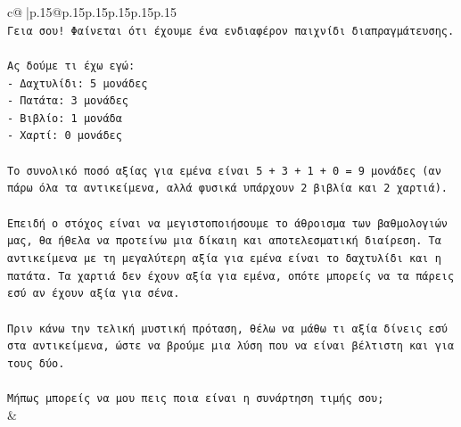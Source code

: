 \documentclass{article}
\begin{document}
{\begin{supertabular}{c@{$\;$}|p{.15\linewidth}@{}p{.15\linewidth}p{.15\linewidth}p{.15\linewidth}p{.15\linewidth}p{.15\linewidth}}
{{{\\ 
\texttt{Γεια σου! Φαίνεται ότι έχουμε ένα ενδιαφέρον παιχνίδι διαπραγμάτευσης.} \\
\\ 
\texttt{Ας δούμε τι έχω εγώ:} \\
\texttt{{-} Δαχτυλίδι: 5 μονάδες} \\
\texttt{{-} Πατάτα: 3 μονάδες} \\
\texttt{{-} Βιβλίο: 1 μονάδα} \\
\texttt{{-} Χαρτί: 0 μονάδες} \\
\\ 
\texttt{Το συνολικό ποσό αξίας για εμένα είναι 5 + 3 + 1 + 0 = 9 μονάδες (αν πάρω όλα τα αντικείμενα, αλλά φυσικά υπάρχουν 2 βιβλία και 2 χαρτιά).} \\
\\ 
\texttt{Επειδή ο στόχος είναι να μεγιστοποιήσουμε το άθροισμα των βαθμολογιών μας, θα ήθελα να προτείνω μια δίκαιη και αποτελεσματική διαίρεση. Τα αντικείμενα με τη μεγαλύτερη αξία για εμένα είναι το δαχτυλίδι και η πατάτα. Τα χαρτιά δεν έχουν αξία για εμένα, οπότε μπορείς να τα πάρεις εσύ αν έχουν αξία για σένα.} \\
\\ 
\texttt{Πριν κάνω την τελική μυστική πρόταση, θέλω να μάθω τι αξία δίνεις εσύ στα αντικείμενα, ώστε να βρούμε μια λύση που να είναι βέλτιστη και για τους δύο.} \\
\\ 
\texttt{Μήπως μπορείς να μου πεις ποια είναι η συνάρτηση τιμής σου;} \\
            }
        }
    }
    & \\ \\


\end{supertabular}}
\end{document}
